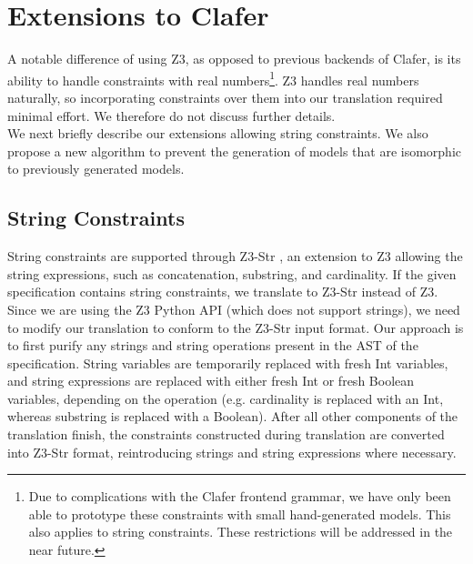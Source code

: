 \documentclass{easychair}
\begin{document}
\section{Extensions to Clafer}
A notable difference of using Z3, as opposed to previous backends of Clafer, is its ability to handle constraints with real numbers\footnote{Due to complications with the Clafer frontend grammar, we have only been able to prototype these constraints with small hand-generated models. This also applies to string constraints. These restrictions will be addressed in the near future.}. Z3 handles real numbers naturally, so incorporating constraints over them into our translation required minimal effort. We therefore do not discuss further details. \\
\indent We next briefly describe our extensions allowing string constraints. We also propose a new algorithm to prevent the generation of models that are isomorphic to previously generated models.

\subsection{String Constraints}
String constraints are supported through Z3-Str \cite{Zheng2013}, an extension to Z3 allowing the string expressions, such as concatenation, substring, and cardinality. If the given specification contains string constraints, we translate to Z3-Str instead of Z3. \\
\indent Since we are using the Z3 Python API (which does not support strings), we need to modify our translation to conform to the Z3-Str input format. Our approach is to first purify any strings and string operations present in the AST of the specification. String variables are temporarily replaced with fresh Int variables, and string expressions are replaced with either fresh Int or fresh Boolean variables, depending on the operation (e.g. cardinality is replaced with an Int, whereas substring is replaced with a Boolean). After all other components of the translation finish, the constraints constructed during translation are converted into Z3-Str format, reintroducing strings and string expressions where necessary.

\begin{figure}[!t]
\centering

\end{figure}
\end{document}
